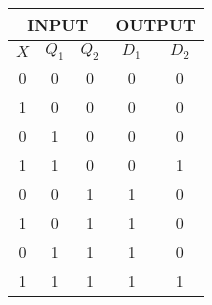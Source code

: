 \begin{tabular}[h]{|c|c|c|c|c|}
\hline \multicolumn{3}{|c|}{INPUT} & \multicolumn{2}{|c|}{OUTPUT} \\
\hline $X$ & $Q_1$ & $Q_2$ & $D_1$ & $D_2$ \\
\hline 0 & 0 & 0 & 0 & 0 \\
\hline 1 & 0 & 0 & 0 & 0 \\
\hline 0 & 1 & 0 & 0 & 0 \\
\hline 1 & 1 & 0 & 0 & 1 \\
\hline 0 & 0 & 1 & 1 & 0 \\
\hline 1 & 0 & 1 & 1 & 0 \\
\hline 0 & 1 & 1 & 1 & 0 \\
\hline 1 & 1 & 1 & 1 & 1 \\
\hline
\end{tabular}
